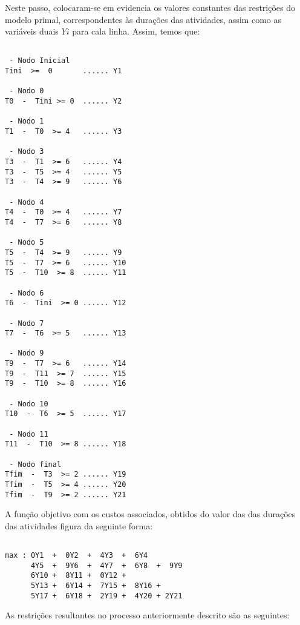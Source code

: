 Neste passo, colocaram-se em evidencia os valores constantes das restrições do
modelo primal, correspondentes às durações das atividades, assim como as variáveis duais $Yi$ para cala linha. Assim, temos que:

\begin{verbatim}

 - Nodo Inicial
Tini  >=  0       ...... Y1

 - Nodo 0
T0  -  Tini >= 0  ...... Y2

 - Nodo 1
T1  -  T0  >= 4   ...... Y3

 - Nodo 3
T3  -  T1  >= 6   ...... Y4
T3  -  T5  >= 4   ...... Y5
T3  -  T4  >= 9   ...... Y6

 - Nodo 4
T4  -  T0  >= 4   ...... Y7
T4  -  T7  >= 6   ...... Y8

 - Nodo 5
T5  -  T4  >= 9   ...... Y9
T5  -  T7  >= 6   ...... Y10
T5  -  T10  >= 8  ...... Y11

 - Nodo 6
T6  -  Tini  >= 0 ...... Y12

 - Nodo 7
T7  -  T6  >= 5   ...... Y13

 - Nodo 9
T9  -  T7  >= 6   ...... Y14
T9  -  T11  >= 7  ...... Y15
T9  -  T10  >= 8  ...... Y16

 - Nodo 10
T10  -  T6  >= 5  ...... Y17

 - Nodo 11
T11  -  T10  >= 8 ...... Y18

 - Nodo final
Tfim  -  T3  >= 2 ...... Y19
Tfim  -  T5  >= 4 ...... Y20
Tfim  -  T9  >= 2 ...... Y21

\end{verbatim}

A função objetivo com os custos associados, obtidos do valor das das durações
das atividades figura da seguinte forma:

\begin{verbatim}

max : 0Y1  +  0Y2  +  4Y3  +  6Y4    
      4Y5  +  9Y6  +  4Y7  +  6Y8  +  9Y9 
      6Y10 +  8Y11 +  0Y12 +  
      5Y13 +  6Y14 +  7Y15 +  8Y16 +  
      5Y17 +  6Y18 +  2Y19 +  4Y20 + 2Y21 

\end{verbatim}

As restrições resultantes no processo anteriormente descrito são as seguintes:


